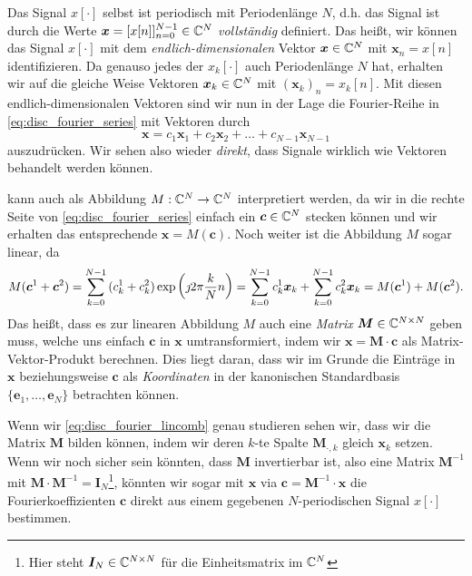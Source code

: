 Das Signal $x[\cdot]$ selbst ist periodisch mit Periodenlänge $N$, d.h. das Signal ist durch die Werte $\bm x = [x[n]]_{n=0}^{N-1} \in \mathbb{C}^N$ \emph{vollständig} definiert. 
Das heißt, wir können das Signal $x[\cdot]$ mit dem \emph{endlich-dimensionalen} Vektor $\bm x \in \mathbb{C}^N$ mit $\bm x_n = x[n]$ identifizieren.
Da genauso jedes der $x_k[\cdot]$ auch Periodenlänge $N$ hat, erhalten wir auf die gleiche Weise Vektoren $\bm x_k \in \mathbb{C}^N$ mit $(\bm x_k)_n = x_k[n]$.
Mit diesen endlich-dimensionalen Vektoren sind wir nun in der Lage die Fourier-Reihe in \eqref{eq:disc_fourier_series} mit  Vektoren durch
%
\begin{equation}\label{eq:disc_fourier_lincomb}
    \bm x = c_1 \bm x_1 + c_2 \bm x_2 + \ldots + c_{N-1} \bm x_{N-1}
\end{equation}
%
auszudrücken.
Wir sehen also wieder \emph{direkt}, dass Signale wirklich wie Vektoren behandelt werden können.

 kann auch als Abbildung $M : \mathbb{C}^N \rightarrow \mathbb{C}^N$ interpretiert werden, da wir in die rechte Seite von \eqref{eq:disc_fourier_series} einfach ein $\bm c \in \mathbb{C}^N$ stecken können und wir erhalten das entsprechende $\bm x = M(\bm c)$.
Noch weiter ist die Abbildung $M$ sogar linear, da 
\[
    M(\bm c^1 + \bm c^2)
        =  {\sum\limits_{k = 0}^{N-1}{
            (c^1_k + c^2_k) \exp\left(
                \jmath 2 \pi \frac{k}{N} n
            \right) 
        }}
        =  {\sum\limits_{k = 0}^{N-1}{
            c^1_k \bm x_k
        }}
        + {\sum\limits_{k = 0}^{N-1}{
            c^2_k \bm x_k 
        }}
        = M(\bm c^1) + M(\bm c^2).
\]
Das heißt, dass es zur linearen Abbildung $M$ auch eine \emph{Matrix} $\bm M \in \mathbb{C}^{N \times N}$ geben muss, welche uns einfach $\bm c$ in $\bm x$ umtransformiert, indem wir $\bm x = \bm M \cdot \bm c$ als Matrix-Vektor-Produkt berechnen.
Dies liegt daran, dass wir im Grunde die Einträge in $\bm x$ beziehungsweise $\bm c$ als \emph{Koordinaten} in der kanonischen Standardbasis $\{\bm e_1, \dots, \bm e_N\}$ betrachten können.

Wenn wir \eqref{eq:disc_fourier_lincomb} genau studieren sehen wir, dass wir die Matrix $\bm M$ bilden können, indem wir deren $k$-te Spalte $\bm M_{\cdot, k}$ gleich $\bm x_k$ setzen.
Wenn wir noch sicher sein könnten, dass $\bm M$ invertierbar ist, also eine Matrix $\bm M^{-1}$ mit $\bm M \cdot \bm M^{-1} = \bm I_N$\footnote{Hier steht $\bm I_N \in \mathbb{C}^{N \times N}$ für die Einheitsmatrix im $\mathbb{C}^N$}, könnten wir sogar mit $\bm x$ via $\bm c = \bm M^{-1} \cdot \bm x$ die Fourierkoeffizienten $\bm c$ direkt aus einem gegebenen $N$-periodischen Signal $x[\cdot]$ bestimmen.

